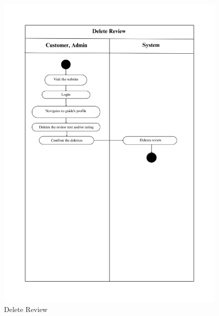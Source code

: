 \begin{figure}[h]
    \centering
    \includegraphics[width=1\textwidth]{Images/Activity Diagrams/29 Delete Review.png}
    \caption{Delete Review}
    \label{fig:activity-delete-review}
\end{figure}

